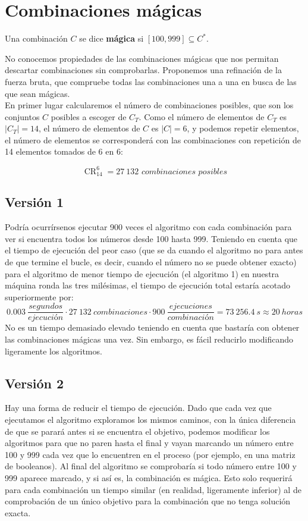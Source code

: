 \section{Combinaciones mágicas}

\begin{definition}
  Una combinación $C$ se dice \textbf{mágica} si $[100,999] \subseteq C^{\ast}$.
\end{definition}

No conocemos propiedades de las combinaciones mágicas que nos permitan descartar
combinaciones sin comprobarlas. Proponemos una refinación de la fuerza bruta, que
compruebe todas las combinaciones una a una en busca de las que sean mágicas. \\

En primer lugar calcularemos el número de combinaciones posibles, que son 
los conjuntos $C$ posibles a escoger de $C_T$. Como el número de elementos de
$C_T$ es $|C_T| = 14$, el número de elementos de $C$ es $|C| = 6$, y
podemos repetir elementos, el número de elementos se corresponderá con
las combinaciones con repetición de 14 elementos tomados de 6 en 6:

\[\operatorname{CR}_{14}^{6} = 27\ 132 \textit{ combinaciones posibles}\]

\subsection{Versión 1}
Podría ocurrírsenos ejecutar 900 veces el algoritmo con cada combinación para
ver si encuentra todos los números desde 100 hasta 999.
Teniendo en cuenta que el tiempo de ejecución del peor caso (que se da cuando
el algoritmo no para antes de que termine el bucle, es decir, cuando el número
no se puede obtener exacto) para el algoritmo de menor tiempo de ejecución
(el algoritmo 1) en nuestra máquina ronda las tres milésimas, el
tiempo de ejecución total estaría acotado superiormente por:
$$ 0.003\ \frac{segundos}{ejecución} \cdot 27\ 132\ combinaciones \cdot 900\  \frac{ejecuciones}{combinación}=73\ 256.4\ s \approx 20\ horas$$
No es un tiempo demasiado elevado teniendo en cuenta que bastaría con obtener
las combinaciones mágicas una vez. Sin embargo, es fácil reducirlo modificando
ligeramente los algoritmos.

\subsection{Versión 2}
Hay una forma de reducir el tiempo de ejecución. Dado que cada vez que
ejecutamos el algoritmo exploramos los mismos caminos, con la única diferencia de
que se parará antes si se encuentra el objetivo, podemos modificar los
algoritmos para que no paren hasta el final y vayan marcando un número entre
100 y 999 cada vez que lo encuentren en el proceso (por ejemplo, en una
matriz de booleanos). Al final del algoritmo se comprobaría si todo número entre
100 y 999 aparece marcado, y si así es, la combinación es mágica. Esto solo
requerirá para cada combinación un tiempo similar (en realidad, ligeramente
inferior) al de comprobación de un único objetivo para la combinación que
no tenga solución exacta.

